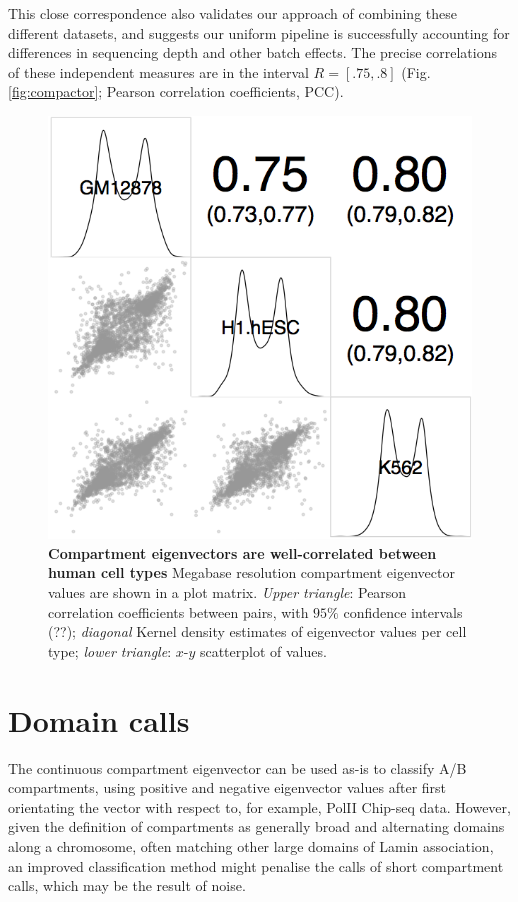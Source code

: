 \documentclass[a4paper,10pt,oneside]{book}
\begin{document}
This close correspondence also validates our approach of combining these different datasets, and suggests our uniform pipeline is successfully accounting for differences in sequencing depth and other batch effects. The precise correlations of these independent measures are in the interval $R = [.75, .8]$ (Fig. \ref{fig:compactor}; Pearson correlation coefficients, PCC).

\begin{figure}
\begin{center}
\includegraphics[width=.5\textwidth]{figs/compartment_corr.png}
\captionsetup{width=\textwidth}
\caption{
{\bf Compartment eigenvectors are well-correlated between human cell types}
Megabase resolution compartment eigenvector values are shown in a plot matrix. \emph{Upper triangle}: Pearson correlation coefficients between pairs, with $95\%$ confidence intervals (??); \emph{diagonal} Kernel density estimates of eigenvector values per cell type; \emph{lower triangle}: $x$-$y$ scatterplot of values.
}\label{fig:compcor}
\end{center}
\end{figure} 

\section{Domain calls}

The continuous compartment eigenvector can be used as-is to classify A/B compartments, using positive and negative eigenvector values after first orientating the vector with respect to, for example, PolII Chip-seq data.\cite{Kalhor2012} However, given the definition of compartments as generally broad and alternating domains along a chromosome, often matching other large domains of Lamin association, an improved classification method might penalise the calls of short compartment calls, which may be the result of noise.
\end{document}
